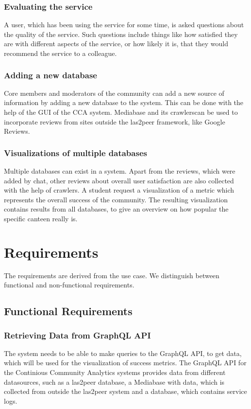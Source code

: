 \subsubsection{Evaluating the service} A user, which has been using the service for some time, is asked questions about the quality of the service. Such questions include things like how satisfied they are with different aspects of the service, or how likely it is, that they would recommend the service to a colleague.

\subsubsection{Adding a new database} Core members and moderators of the community can add a new source of information by adding a new database to the system. This can be done with the help of the GUI of the CCA system. Mediabase and its crawlerscan be used to incorporate reviews from sites outside the las2peer framework, like Google Reviews.

\subsubsection{Visualizations of multiple databases} Multiple databases can exist in a system. Apart from the reviews, which were added by chat, other reviews about overall user satisfaction are also collected with the help of crawlers. A student request a visualization of a metric which represents the overall success of the community. The resulting visualization contains results from all databases, to give an overview on how popular the specific canteen really is.

\section{Requirements}
The requirements are derived from the use case. We distinguish between functional and non-functional requirements.
\subsection{Functional Requirements}

\subsubsection{Retrieving Data from GraphQL API}
The system needs to be able to make queries to the GraphQL API, to get data, which will be used for the visualization of success metrics. The GraphQL API  for the Continious Community Analytics systems provides data from different datasources, such as a las2peer database, a Mediabase with data, which is collected from outside the las2peer system and a database, which contains service logs.

